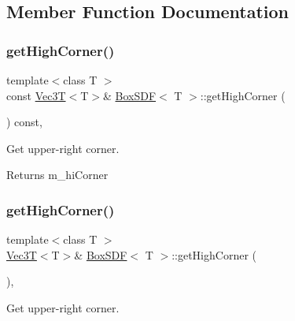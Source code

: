 \subsection{Member Function Documentation}
\mbox{\label{classBoxSDF_a10f3d6859f29566cca0bf2e89d1142c3}} 
\subsubsection{\texorpdfstring{get\+High\+Corner()}{getHighCorner()}\hspace{0.1cm}{\footnotesize\ttfamily [1/2]}}
{\footnotesize\ttfamily template$<$class T $>$ \\
const \hyperlink{classVec3T}{Vec3T}$<$T$>$\& \hyperlink{classBoxSDF}{Box\+S\+DF}$<$ T $>$\+::get\+High\+Corner (\begin{DoxyParamCaption}{ }\end{DoxyParamCaption}) const\hspace{0.3cm}{\ttfamily [inline]}, {\ttfamily [noexcept]}}



Get upper-\/right corner. 

\begin{DoxyReturn}{Returns}
m\+\_\+hi\+Corner 
\end{DoxyReturn}
\mbox{\label{classBoxSDF_a624cf8fea66776ecce602039beb1059c}} 
\subsubsection{\texorpdfstring{get\+High\+Corner()}{getHighCorner()}\hspace{0.1cm}{\footnotesize\ttfamily [2/2]}}
{\footnotesize\ttfamily template$<$class T $>$ \\
\hyperlink{classVec3T}{Vec3T}$<$T$>$\& \hyperlink{classBoxSDF}{Box\+S\+DF}$<$ T $>$\+::get\+High\+Corner (\begin{DoxyParamCaption}{ }\end{DoxyParamCaption})\hspace{0.3cm}{\ttfamily [inline]}, {\ttfamily [noexcept]}}



Get upper-\/right corner. 

